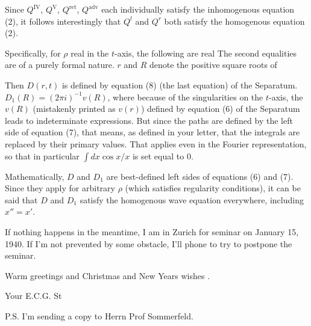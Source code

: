 Since $Q^\text{IV}$, $Q^\text{V}$, $Q^\text{ret}$, $Q^\text{adv}$ each individually satisfy the inhomogenous equation (2), it follows interestingly that $Q^l$ and $Q^r$ both satisfy the homogenous equation (2).

Specifically, for $\rho$ real in the $t$-axis, the following are real
The second equalities are of a purely formal nature. $r$ and $R$ denote the positive square roots of

Then $D(r,t)$ is defined by equation (8) (the last equation) of the Separatum. $D_1(R) = (2\pi i)^{-1}v(R)$, where because of the singularities on the $t$-axis, the $v(R)$ (mistakenly printed as $v(r)$) defined by equation (6) of the Separatum leads to indeterminate expressions. But since the paths are defined by the left side of equation (7), that means, as defined in your letter, that the integrals are replaced by their primary values. That applies even in the Fourier representation, so that in particular $\int{dx}\cos{x}/x$ is set equal to $0$.

Mathematically, $D$ and $D_1$ are best-defined left sides of equations (6) and (7). Since they apply for arbitrary $\rho$ (which satisfies regularity conditions), it can be said that $D$ and $D_1$ satisfy the homogenous wave equation everywhere, including $x''=x'$.

If nothing happens in the meantime, I am in Zurich for seminar on January 15, 1940. If I'm not prevented by some obstacle, I'll phone to try to postpone the seminar.

Warm greetings and Christmas and New Years wishes .

Your E.C.G. St

P.S. I'm sending a copy to Herrn Prof Sommerfeld.
